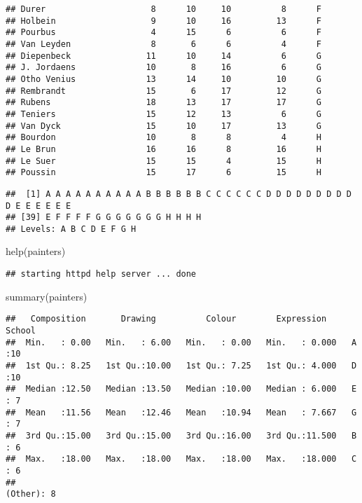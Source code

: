 \documentclass[
]{article}
\newenvironment{Shaded}{\begin{snugshade}}{\end{snugshade}}
\newcommand{\FunctionTok}[1]{\textcolor[rgb]{0.00,0.00,0.00}{#1}}
\newcommand{\NormalTok}[1]{#1}
\newcommand{\SpecialCharTok}[1]{\textcolor[rgb]{0.00,0.00,0.00}{#1}}
\begin{document}
\begin{verbatim}
## Durer                     8      10     10          8      F
## Holbein                   9      10     16         13      F
## Pourbus                   4      15      6          6      F
## Van Leyden                8       6      6          4      F
## Diepenbeck               11      10     14          6      G
## J. Jordaens              10       8     16          6      G
## Otho Venius              13      14     10         10      G
## Rembrandt                15       6     17         12      G
## Rubens                   18      13     17         17      G
## Teniers                  15      12     13          6      G
## Van Dyck                 15      10     17         13      G
## Bourdon                  10       8      8          4      H
## Le Brun                  16      16      8         16      H
## Le Suer                  15      15      4         15      H
## Poussin                  15      17      6         15      H
\end{verbatim}

\begin{Shaded}
\end{Shaded}

\begin{verbatim}
##  [1] A A A A A A A A A A B B B B B B C C C C C C D D D D D D D D D D E E E E E E
## [39] E F F F F G G G G G G G H H H H
## Levels: A B C D E F G H
\end{verbatim}

\begin{Shaded}
\begin{Highlighting}[]
\FunctionTok{help}\NormalTok{(painters)}
\end{Highlighting}
\end{Shaded}

\begin{verbatim}
## starting httpd help server ... done
\end{verbatim}

\begin{Shaded}
\begin{Highlighting}[]
\FunctionTok{summary}\NormalTok{(painters)}
\end{Highlighting}
\end{Shaded}

\begin{verbatim}
##   Composition       Drawing          Colour        Expression         School  
##  Min.   : 0.00   Min.   : 6.00   Min.   : 0.00   Min.   : 0.000   A      :10  
##  1st Qu.: 8.25   1st Qu.:10.00   1st Qu.: 7.25   1st Qu.: 4.000   D      :10  
##  Median :12.50   Median :13.50   Median :10.00   Median : 6.000   E      : 7  
##  Mean   :11.56   Mean   :12.46   Mean   :10.94   Mean   : 7.667   G      : 7  
##  3rd Qu.:15.00   3rd Qu.:15.00   3rd Qu.:16.00   3rd Qu.:11.500   B      : 6  
##  Max.   :18.00   Max.   :18.00   Max.   :18.00   Max.   :18.000   C      : 6  
##                                                                   (Other): 8
\end{verbatim}
\end{document}
